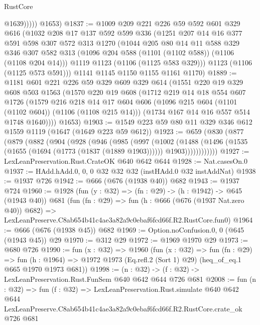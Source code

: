 \begin{lexlean}{RustCore}
\begin{coremodule}
                @1639)))))
      @1653)
@1837 := @1009
    @209
    @221
    @226
    @59
    @592
    @601
    @329
    @616
    (@1032
      @208
      @17
      @137
      @592
      @599
      @336
      (@1251
        @207
        @14
        @16
        @377
        @591
        @598
        @307
        @572
        @313
        @1270
        (@1044
          @205
          @80
          @14
          @11
          @588
          @329
          @346
          @307
          @582
          @313
          (@1096 @204 @588 (@1101 (@1102 @588)) (@1106 (@1108 @204 @14)))
          @1119
          @1123
          (@1106 (@1125 @583 @329)))
        @1123
        (@1106 (@1125 @573 @591)))
      @1141
      @1145
      @1150
      @1155
      @1161
      @1170)
@1889 := @1181
    @601
    @221
    @226
    @59
    @329
    @609
    @329
    @614
    (@1551
      @220
      @19
      @329
      @608
      @503
      @1563
      (@1570
        @220
        @19
        @608
        (@1712
          @219
          @14
          @18
          @554
          @607
          @1726
          (@1579
            @216
            @218
            @14
            @17
            @604
            @606
            (@1096 @215 @604 (@1101 (@1102 @604)) (@1106 (@1108 @215 @14)))
            (@1734 @167 @14 @16 @557 @514 @1748 @1640))))
      @1653)
@1903 := @1549 @223 @59 @80 @11 @329 @346 @612 @1559 @1119 (@1647 (@1649 @223 @59 @612))
@1923 := @659
    (@830
      (@877
        (@879
          (@882
            (@904
              (@928
                (@946
                  (@985
                    (@997
                      (@1002
                        (@1488
                          (@1496
                            (@1535 (@1655 (@1694 (@1773 (@1837 (@1889 @1903))))))
                            @1903))))))))))))
@1927 := LexLeanPreservation.Rust.CrateOK @640 @642 @644
@1928 := Nat.casesOn.{0}
@1937 := HAdd.hAdd.{0, 0, 0} @32 @32 @32 (instHAdd.{0} @32 instAddNat)
@1938 := @1937 @726
@1942 := @666 (@676 (@1938 @40)) @682
@1943 := @1937 @724
@1960 := @1928
    (fun (y : @32) => (fn : @29) -> (h : @1942) -> @645 (@1943 @40))
    @681
    (fun (fn : @29) =>
    fun (h : @666 (@676 (@1937 Nat.zero @40)) @682) =>
    LexLeanPreserve.C8ab654b41c4ae3a82a9c0ebaf6fcd66f.R2.RustCore.fun0)
@1964 := @666 (@676 (@1938 @45)) @682
@1969 := Option.noConfusion.{0, 0} (@645 (@1943 @45)) @29
@1970 := @312 @29
@1972 := @1969 @1970 @29
@1973 := @680 @726
@1990 := fun (x : @32) =>
  @1960
    (fun (x : @32) =>
    fun (fn : @29) =>
    fun (h : @1964) => @1972 @1973 (Eq.refl.{2} (Sort 1) @29) (heq_of_eq.{1} @665 @1970 @1973 @681))
@1998 := (n : @32) -> (f : @32) -> LexLeanPreservation.Rust.FunSem @640 @642 @644 @726 @681
@2008 := fun (n : @32) =>
  fun (f : @32) =>
  LexLeanPreservation.Rust.simulate
    @640
    @642
    @644
    LexLeanPreserve.C8ab654b41c4ae3a82a9c0ebaf6fcd66f.R2.RustCore.crate_ok
    @726
    @681
\end{coremodule}
\end{lexlean}
